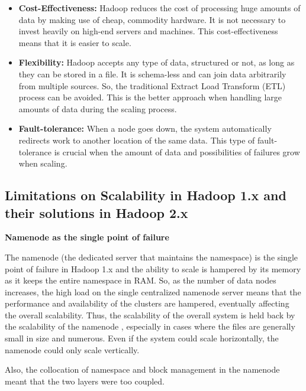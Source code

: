 \documentclass[conference]{IEEEtran}
\begin{document}
\begin{itemize}

    \item \textbf{Cost-Effectiveness:} Hadoop reduces the cost of processing huge amounts of data by making use of cheap, commodity hardware. 
            It is not necessary to invest heavily on high-end servers and machines. 
            This cost-effectiveness means that it is easier to scale.

    \item \textbf{Flexibility:} Hadoop accepts any type of data, structured or not, as long as they can be stored in a file. 
            It is schema-less and can join data arbitrarily from multiple sources. 
            So, the traditional Extract Load Transform (ETL) process can be avoided. 
            This is the better approach when handling large amounts of data during the scaling process.

   \item \textbf{Fault-tolerance:} When a node goes down, the system automatically redirects work to another location of the same data. 
       This type of fault-tolerance is crucial when the amount of data and possibilities of failures grow when scaling.

\end{itemize}

\subsection{Limitations on Scalability in Hadoop 1.x and their solutions in Hadoop 2.x}

\textbf{Namenode as the single point of failure}

The namenode (the dedicated server that maintains the namespace) is the single point of failure in Hadoop 1.x 
and the ability to scale is hampered by its memory as it keeps the entire namespace in RAM. 
So, as the number of data nodes increases, the high load on the single centralized namenode server means 
that the performance and availability of the clusters are hampered, eventually affecting the overall scalability. 
Thus, the scalability of the overall system is held back by the scalability of the namenode \cite{Shvachko2010}, especially in 
cases where the files are generally small in size and numerous. Even if the system could scale horizontally, the 
namenode could only scale vertically. 

Also, the collocation of namespace and block management in the namenode meant that the two layers were too coupled. 
\end{document}
